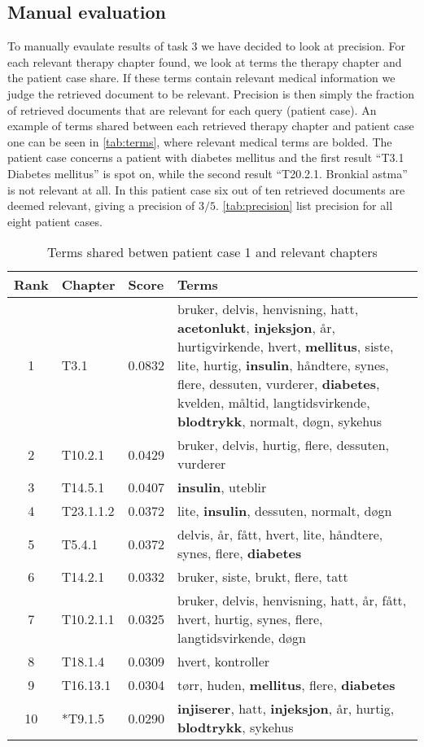 \documentclass[a4paper, 11pt]{article}
\begin{document}
\subsection{Manual evaluation}
To manually evaulate results of task 3 we have decided to look at precision.
For each relevant therapy chapter found, we look at terms the therapy chapter
and the patient case share. If these terms contain relevant medical
information we judge the retrieved document to be relevant. Precision is then
simply the fraction of retrieved documents that are relevant for each query
(patient case). An example of terms shared between each retrieved therapy
chapter and patient case one can be seen in \autoref{tab:terms}, where
relevant medical terms are bolded. The patient case concerns a patient with
diabetes mellitus and the first result ``T3.1 Diabetes mellitus'' is spot on,
while the second result ``T20.2.1. Bronkial astma'' is not relevant at all.
In this patient case six out of ten retrieved documents are deemed relevant,
giving a precision of \( 3/5 \). \autoref{tab:precision} list precision for
all eight patient cases.
\begin{table}[htbp] \footnotesize \center
\caption{Terms shared betwen patient case 1 and relevant chapters\label{tab:terms}}
\begin{tabularx}{\textwidth}{c l l X}
    \toprule
    Rank & Chapter & Score & Terms \\
    \midrule
	1 & T3.1 & 0.0832 & bruker, delvis, henvisning, hatt, \textbf{acetonlukt}, \textbf{injeksjon}, år, hurtigvirkende, hvert, \textbf{mellitus}, siste, lite, hurtig, \textbf{insulin}, håndtere, synes, flere, dessuten, vurderer, \textbf{diabetes}, kvelden, måltid, langtidsvirkende, \textbf{blodtrykk}, normalt, døgn, sykehus \\
	2 & T10.2.1 & 0.0429 & bruker, delvis, hurtig, flere, dessuten, vurderer \\
	3 & T14.5.1 & 0.0407 & \textbf{insulin}, uteblir \\
	4 & T23.1.1.2 & 0.0372 & lite, \textbf{insulin}, dessuten, normalt, døgn \\
	5 & T5.4.1 & 0.0372 & delvis, år, fått, hvert, lite, håndtere, synes, flere, \textbf{diabetes} \\
	6 & T14.2.1 & 0.0332 & bruker, siste, brukt, flere, tatt \\
	7 & T10.2.1.1 & 0.0325 & bruker, delvis, henvisning, hatt, år, fått, hvert, hurtig, synes, flere, langtidsvirkende, døgn \\
	8 & T18.1.4 & 0.0309 & hvert, kontroller \\
	9 & T16.13.1 & 0.0304 & tørr, huden, \textbf{mellitus}, flere, \textbf{diabetes} \\
	10 & *T9.1.5 & 0.0290 & \textbf{injiserer}, hatt, \textbf{injeksjon}, år, hurtig, \textbf{blodtrykk}, sykehus \\
	\bottomrule
\end{tabularx}
\end{table}
\end{document}
